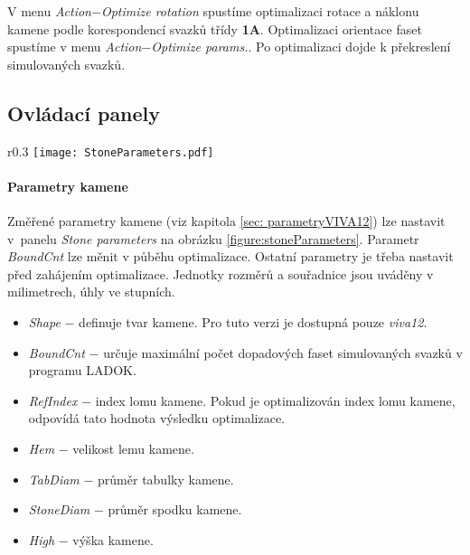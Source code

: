 V menu \textit{Action}$-$\textit{Optimize rotation} spustíme optimalizaci rotace a náklonu kamene podle korespondencí svazků třídy \textbf{1A}. Optimalizaci orientace faset spustíme v menu \textit{Action}$-$\textit{Optimize params.}. Po optimalizaci dojde k překreslení simulovaných svazků.   




\subsection{Ovládací panely}
\label{sec:panely}

\begin{wrapfigure}[14]{r}{0.3\textwidth}
\centering
\texttt{[image: StoneParameters.pdf]}
	
\caption[Panel s nastavením parametrů kamene.]{Panel s nastavením parametrů kamene.}
\label{figure:stoneParameters}
\end{wrapfigure}


\paragraph{Parametry kamene}
\hspace{1mm}
\vspace{2mm}


Změřené parametry kamene (viz kapitola \ref{sec: parametryVIVA12}) lze nastavit v~panelu \textit{Stone parameters} na obrázku \ref{figure:stoneParameters}. Parametr \textit{BoundCnt} lze měnit v půběhu optimalizace. Ostatní parametry je třeba nastavit před zahájením optimalizace. Jednotky rozměrů a souřadnice jsou uváděny v milimetrech, úhly ve stupních.

\begin{itemize}
\item \textit{Shape} $-$ definuje tvar kamene. Pro tuto verzi je dostupná pouze \textit{viva12}.

\item \textit{BoundCnt} $-$ určuje maximální počet dopadových faset simulovaných svazků v programu LADOK.

\item \textit{RefIndex} $-$ index lomu kamene. Pokud je optimalizován index lomu kamene, odpovídá tato hodnota výsledku optimalizace.

\item \textit{Hem} $-$ velikost lemu kamene. 

\item \textit{TabDiam} $-$ průměr tabulky kamene. 

\item \textit{StoneDiam} $-$ průměr spodku kamene. 

\item \textit{High}	$-$ výška kamene. 
\end{itemize}

